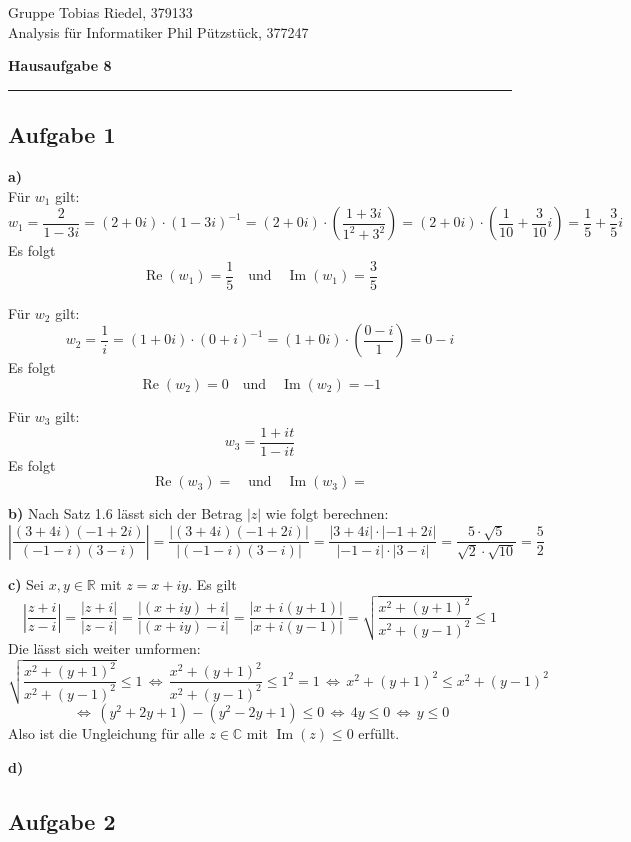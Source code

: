 \documentclass[a4paper,graphics,11pt]{article}
\newcommand{\aufgabe}[1]{\subsection*{Aufgabe #1}}
\newcommand{\re}{\operatorname{Re}}
\newcommand{\im}{\operatorname{Im}}
\begin{document}
\noindent Gruppe              \hfill Tobias Riedel, 379133 \\
\noindent Analysis für Informatiker             \hfill Phil Pützstück, 377247 \\
\begin{center}
	\LARGE{\textbf{Hausaufgabe 8}}
\end{center}
\begin{center}
\rule[0.1ex]{\textwidth}{1pt}
\end{center}



\aufgabe{1}
\textbf{a)}\\[5pt]
Für $w_1$ gilt:
$$
    w_1 = \frac{2}{1-3i}
    = (2+0i)\cdot (1-3i)^{-1}
    = (2+0i) \cdot \left(\frac{1+3i}{1^2+3^2}\right)
    = (2+0i) \cdot \left(\frac{1}{10} + \frac{3}{10}i\right)
    = \frac{1}{5} + \frac{3}{5}i
$$
Es folgt
$$
    \re(w_1) = \frac{1}{5} \quad \text{und}\quad \im(w_1) = \frac{3}{5}
$$

Für $w_2$ gilt:
$$
    w_2 = \frac{1}{i}
    = (1+0i)\cdot (0+i)^{-1}
    = (1+0i)\cdot\left(\frac{0-i}{1}\right)
    = 0-i
$$
Es folgt
$$
    \re(w_2) = 0 \quad \text{und}\quad \im(w_2) = -1
$$

Für $w_3$ gilt:
$$
    w_3 = \frac{1+it}{1-it}
$$
Es folgt
$$
    \re(w_3) = \quad \text{und}\quad \im(w_3) = 
$$

\textbf{b)}
Nach Satz 1.6 lässt sich der Betrag $|z|$ wie folgt berechnen:
$$
    \left|\frac{(3+4i)(-1+2i)}{(-1-i)(3-i)}\right|
    = \frac{|(3+4i)(-1+2i)|}{|(-1-i)(3-i)|}
    =\frac{|3+4i|\cdot|-1+2i|}{|-1-i|\cdot|3-i|} 
    = \frac{5\cdot\sqrt{5}}{\sqrt{2}\cdot\sqrt{10}} = \frac{5}{2}
$$

\textbf{c)}
Sei $x,y \in \mathbb{R}$ mit $z=x+iy$. Es gilt
$$
    \left|\frac{z+i}{z-i}\right|
    = \frac{|z+i|}{|z-i|}
    = \frac{|(x+iy)+i|}{|(x+iy)-i|}
    = \frac{|x+i(y+1)|}{|x+i(y-1)|}
    = \sqrt{\frac{x^2+(y+1)^2}{x^2+(y-1)^2}}
    \leq 1
$$
Die lässt sich weiter umformen:
$$
    \sqrt{\frac{x^2+(y+1)^2 }{x^2+(y-1)^2}} \leq 1
    \,\Longleftrightarrow\, \frac{x^2+(y+1)^2}{x^2+(y-1)^2} \leq 1^2 = 1
    \,\Longleftrightarrow\, x^2+(y+1)^2 \leq x^2+(y-1)^2
$$$$
    \,\Longleftrightarrow\, (y^2+2y+1)-(y^2-2y+1) \leq 0
    \,\Longleftrightarrow\, 4y \leq 0
    \,\Longleftrightarrow\, y \leq 0
$$
Also ist die Ungleichung für alle $z \in \mathbb{C}$ mit $\im(z) \leq 0$ erfüllt.

\newpage

\textbf{d)}

\aufgabe{2}
\end{document}
